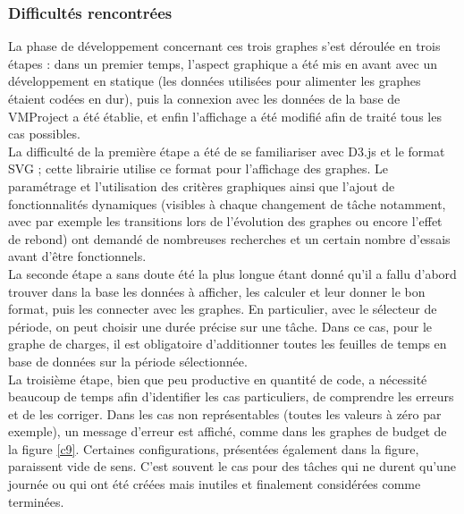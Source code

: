 \documentclass[12pt]{report}
\begin{document}
	\subsubsection{Difficultés rencontrées}
	
	La phase de développement concernant ces trois graphes s’est déroulée en trois étapes : dans un premier temps, l’aspect graphique a été mis en avant avec un développement en statique (les données utilisées pour alimenter les graphes étaient codées en dur), puis la connexion avec les données de la base de VMProject a été établie, et enfin l’affichage a été modifié afin de traité tous les cas possibles. \\
	
La difficulté de la première étape a été de se familiariser avec D3.js et le format SVG ; cette librairie utilise ce format pour l’affichage des graphes. Le paramétrage et l’utilisation des critères graphiques ainsi que l’ajout de fonctionnalités dynamiques (visibles à chaque changement de tâche notamment, avec par exemple les transitions lors de l’évolution des graphes ou encore l’effet de rebond) ont demandé de nombreuses recherches et un certain nombre d’essais avant d’être fonctionnels. \\
	
La seconde étape a sans doute été la plus longue étant donné qu’il a fallu d’abord trouver dans la base les données à afficher, les calculer et leur donner le bon format, puis les connecter avec les graphes. En particulier, avec le sélecteur de période, on peut choisir une durée précise sur une tâche. Dans ce cas, pour le graphe de charges, il est obligatoire d’additionner toutes les feuilles de temps en base de données sur la période sélectionnée.\\
	
La troisième étape, bien que peu productive en quantité de code, a nécessité beaucoup de temps afin d’identifier les cas particuliers, de comprendre les erreurs et de les corriger. Dans les cas non représentables (toutes les valeurs à zéro par exemple), un message d’erreur est affiché, comme dans les graphes de budget de la figure \ref{c9}. Certaines configurations, présentées également dans la figure, paraissent vide de sens. C’est souvent le cas pour des tâches qui ne durent qu’une journée ou qui ont été créées mais inutiles et finalement considérées comme terminées.\\
	
\end{document}
